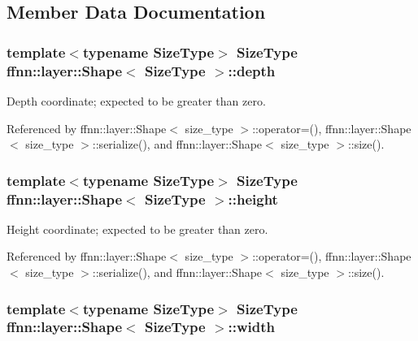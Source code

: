 \subsection{Member Data Documentation}
\hypertarget{structffnn_1_1layer_1_1_shape_a37ec3deb8c9f2d6617e6f63799c0fcbf}{
\subsubsection[{depth}]{\setlength{\rightskip}{0pt plus 5cm}template$<$typename Size\-Type$>$ Size\-Type {\bf ffnn\-::layer\-::\-Shape}$<$ Size\-Type $>$\-::depth}}\label{structffnn_1_1layer_1_1_shape_a37ec3deb8c9f2d6617e6f63799c0fcbf}


Depth coordinate; expected to be greater than zero. 



Referenced by ffnn\-::layer\-::\-Shape$<$ size\-\_\-type $>$\-::operator=(), ffnn\-::layer\-::\-Shape$<$ size\-\_\-type $>$\-::serialize(), and ffnn\-::layer\-::\-Shape$<$ size\-\_\-type $>$\-::size().

\hypertarget{structffnn_1_1layer_1_1_shape_a96608d7bcef7733a1b1f4782827a0c78}{
\subsubsection[{height}]{\setlength{\rightskip}{0pt plus 5cm}template$<$typename Size\-Type$>$ Size\-Type {\bf ffnn\-::layer\-::\-Shape}$<$ Size\-Type $>$\-::height}}\label{structffnn_1_1layer_1_1_shape_a96608d7bcef7733a1b1f4782827a0c78}


Height coordinate; expected to be greater than zero. 



Referenced by ffnn\-::layer\-::\-Shape$<$ size\-\_\-type $>$\-::operator=(), ffnn\-::layer\-::\-Shape$<$ size\-\_\-type $>$\-::serialize(), and ffnn\-::layer\-::\-Shape$<$ size\-\_\-type $>$\-::size().

\hypertarget{structffnn_1_1layer_1_1_shape_a860cbac53d9e20bdf8283298c6369cbc}{
\subsubsection[{width}]{\setlength{\rightskip}{0pt plus 5cm}template$<$typename Size\-Type$>$ Size\-Type {\bf ffnn\-::layer\-::\-Shape}$<$ Size\-Type $>$\-::width}}\label{structffnn_1_1layer_1_1_shape_a860cbac53d9e20bdf8283298c6369cbc}


